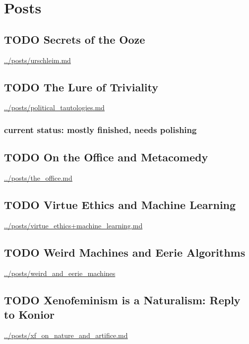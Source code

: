 \documentclass[11pt]{article}
\date{\today}
\title{}
\begin{document}
\tableofcontents

\section{Posts}
\label{sec:org837d35d}
\subsection{{\bfseries\sffamily TODO} Secrets of the Ooze}
\label{sec:org4020524}
\url{../posts/urschleim.md}

\subsection{{\bfseries\sffamily TODO} The Lure of Triviality}
\label{sec:org192c19b}
\url{../posts/political\_tautologies.md}

\subsubsection{current status: mostly finished, needs polishing}
\label{sec:org94c81ee}


\subsection{{\bfseries\sffamily TODO} On the Office and Metacomedy}
\label{sec:orga76fbf3}
\url{../posts/the\_office.md}

\subsection{{\bfseries\sffamily TODO} Virtue Ethics and Machine Learning}
\label{sec:org753468f}
\url{../posts/virtue\_ethics+machine\_learning.md}

\subsection{{\bfseries\sffamily TODO} Weird Machines and Eerie Algorithms}
\label{sec:org2d0c6a6}
\url{../posts/weird\_and\_eerie\_machines}

\subsection{{\bfseries\sffamily TODO} Xenofeminism is a Naturalism: Reply to Konior}
\label{sec:org9074b4e}
\url{../posts/xf\_on\_nature\_and\_artifice.md}
\end{document}
